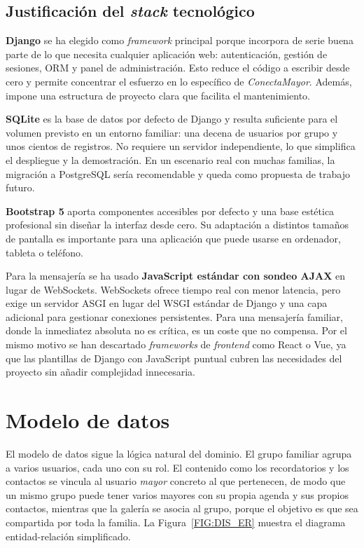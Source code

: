 \subsection{Justificación del \emph{stack} tecnológico\label{SUB:DIS_STACK}}


\textbf{Django} se ha elegido como \emph{framework} principal porque
incorpora de serie buena parte de lo que necesita cualquier aplicación
web: autenticación, gestión de sesiones, ORM y panel de administración.
Esto reduce el código a escribir desde cero y permite concentrar el
esfuerzo en lo específico de \emph{ConectaMayor}. Además, impone una
estructura de proyecto clara que facilita el mantenimiento.

\textbf{SQLite} es la base de datos por defecto de Django y resulta
suficiente para el volumen previsto en un entorno familiar: una decena de
usuarios por grupo y unos cientos de registros. No requiere un servidor
independiente, lo que simplifica el despliegue y la demostración. En un
escenario real con muchas familias, la migración a PostgreSQL sería
recomendable y queda como propuesta de trabajo futuro.

\textbf{Bootstrap 5} aporta componentes accesibles
por defecto y una base estética profesional sin diseñar la interfaz desde
cero. Su adaptación a distintos tamaños de pantalla es importante para una
aplicación que puede usarse en ordenador, tableta o teléfono.

Para la mensajería se ha usado \textbf{JavaScript estándar con sondeo
AJAX} en lugar de WebSockets. WebSockets ofrece tiempo
real con menor latencia, pero exige un servidor ASGI en lugar del WSGI
estándar de Django y una capa adicional para gestionar conexiones
persistentes. Para una mensajería familiar, donde la inmediatez absoluta
no es crítica, es un coste que no compensa. Por el mismo motivo se han descartado
\emph{frameworks} de \emph{frontend} como React o Vue, ya que las
plantillas de Django con JavaScript puntual cubren las necesidades del
proyecto sin añadir complejidad innecesaria.


\section{Modelo de datos\label{SEC:DIS_DATOS}}

El modelo de datos sigue la lógica natural del dominio. El grupo familiar
agrupa a varios usuarios, cada uno con su rol. El contenido como los recordatorios y los contactos se vincula al
usuario \emph{mayor} concreto al que pertenecen, de modo que un mismo
grupo puede tener varios mayores con su propia agenda y sus propios
contactos, mientras que la galería se asocia al grupo, porque el objetivo es que sea compartida por toda la familia. La Figura~\ref{FIG:DIS_ER} muestra el diagrama
entidad-relación simplificado.

